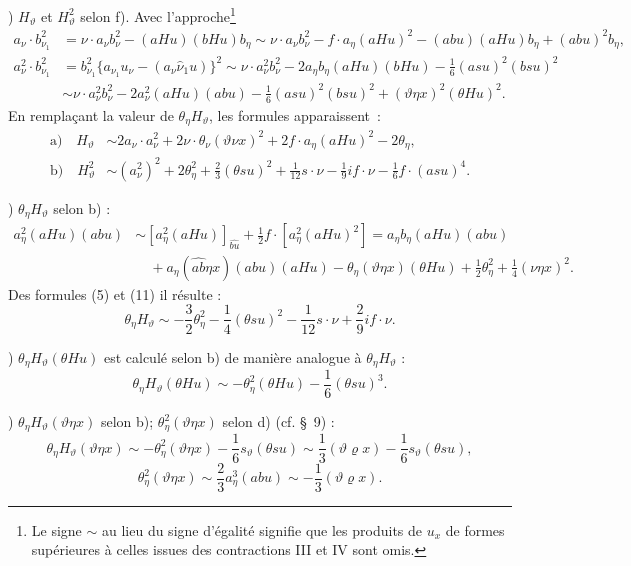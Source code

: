 \documentclass[11pt]{article}
\newcommand{\R}{\varrho}
\begin{document}
) $H_\vartheta$ et $H_\vartheta^2$ selon f). Avec l'approche\footnote{Le signe $\sim$ au lieu du signe d'égalité signifie que les produits de $u_x$ de formes supérieures à celles issues des contractions III et IV sont omis.}
\[
\begin{aligned}
a_\nu\cdot b_{\nu_1}^2
&=\nu\cdot a_\nu b_\nu^2-(aHu)(bHu)b_\eta
\sim \nu\cdot a_\nu b_\nu^2-f\cdot a_\eta(aHu)^2-(abu)(aHu)b_\eta+(abu)^2b_\eta,\\
a_\nu^2\cdot b_{\nu_1}^2
&=b_{\nu_1}^2\{a_{\nu_1}u_\nu-(a_\nu\widehat{\nu}_1u)\}^2
\sim \nu\cdot a_\nu^2b_\nu^2-2a_\eta b_\eta(aHu)(bHu)-\frac16(asu)^2(bsu)^2\\
&\sim \nu\cdot a_\nu^2b_\nu^2-2a_\nu^2(aHu)(abu)-\frac16(asu)^2(bsu)^2+(\vartheta\eta x)^2(\theta Hu)^2.
\end{aligned}
\]
En remplaçant la valeur de $\theta_\eta H_\vartheta$, les formules apparaissent :
\[
\tag{12}
\begin{aligned}
\text{a)}\quad H_\vartheta&\sim 2a_\nu\cdot a_\nu^2+2\nu\cdot\theta_\nu(\vartheta\nu x)^2+2f\cdot a_\eta(aHu)^2-2\theta_\eta,\\
\text{b)}\quad H_\vartheta^2&\sim (a_\nu^2)^2+2\theta_\eta^2+\frac23(\theta su)^2+\frac1{12}s\cdot\nu-\frac19 i f\cdot\nu-\frac16f\cdot(asu)^4.
\end{aligned}
\]

) $\theta_\eta H_\vartheta$ selon b) :
\[
\begin{aligned}
a_\eta^2(aHu)(abu)&\sim [a_\eta^2(aHu)]_{\widehat{bu}}+\frac12 f\cdot[a_\eta^2(aHu)^2]
=a_\eta b_\eta(aHu)(abu)\\
&\quad+a_\eta(\widehat{ab}\eta x)(abu)(aHu)-\theta_\eta(\vartheta\eta x)(\theta Hu)+\frac12\theta_\eta^2+\frac14(\nu\eta x)^2.
\end{aligned}
\]
Des formules (5) et (11) il résulte :
\[
\theta_\eta H_\vartheta\sim -\frac32\theta_\eta^2-\frac14(\theta su)^2-\frac1{12}s\cdot\nu+\frac29i f\cdot\nu.
\]

) $\theta_\eta H_\vartheta(\theta Hu)$ est calculé selon b) de manière analogue à $\theta_\eta H_\vartheta$ :
\[
\theta_\eta H_\vartheta(\theta Hu)\sim-\theta_\eta^2(\theta Hu)-\frac16(\theta su)^3.
\]

) $\theta_\eta H_\vartheta(\vartheta\eta x)$ selon b); $\theta_\eta^2(\vartheta\eta x)$ selon d) (cf. \S\ 9) :
\[
\theta_\eta H_\vartheta(\vartheta\eta x)\sim-\theta_\eta^2(\vartheta\eta x)-\frac16s_\vartheta(\theta su)
\sim\frac13(\vartheta\R x)-\frac16s_\vartheta(\theta su),
\]
\[
\theta_\eta^2(\vartheta\eta x)\sim\frac23a_\eta^3(abu)\sim-\frac13(\vartheta\R x).
\]
\end{document}
